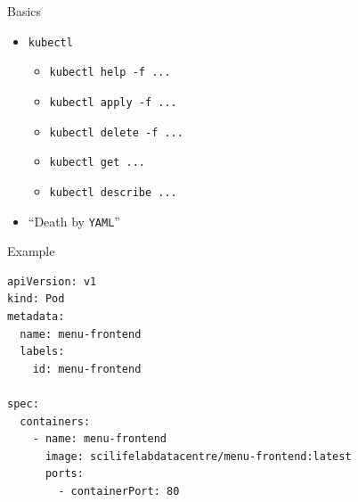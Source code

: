 \documentclass{dcpresentation}
\begin{document}
 \begin{frame}{Basics}
  \begin{itemize}
   \item \texttt{kubectl}
   \begin{itemize}
    \item \texttt{kubectl help -f ...}
    \item \texttt{kubectl apply -f ...}
    \item \texttt{kubectl delete -f ...}
    \item \texttt{kubectl get ...}
    \item \texttt{kubectl describe ...}
   \end{itemize}
   \item ``Death by \texttt{YAML}''
  \end{itemize}
 \end{frame}
  
 \begin{frame}[fragile]{Example}
  \small
  \begin{verbatim}
apiVersion: v1
kind: Pod
metadata:
  name: menu-frontend
  labels:
    id: menu-frontend

spec:
  containers:
    - name: menu-frontend
      image: scilifelabdatacentre/menu-frontend:latest
      ports:
        - containerPort: 80
  \end{verbatim}
 \end{frame}
 
\end{document}
